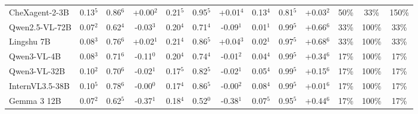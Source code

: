 \documentclass{article}
\begin{document}
\begin{table}[t]
{\begin{tabular}{l@{\hspace{3pt}}ccc@{\hspace{4pt}}ccc@{\hspace{4pt}}ccc@{\hspace{4pt}}ccc}
CheXagent-2-3B & \cellcolor{cfSage3}0.13$^{5}$ & \cellcolor{cfSage3}0.86$^{6}$ & \cellcolor{cfTerra1}+0.00$^{2}$ & \cellcolor{cfSage4}0.21$^{5}$ & \cellcolor{cfSage4}0.95$^{5}$ & \cellcolor{cfTerra1}+0.01$^{4}$ & \cellcolor{cfSage3}0.13$^{4}$ & \cellcolor{cfSage3}0.81$^{5}$ & \cellcolor{cfTerra2}+0.03$^{2}$ & \cellcolor{cfTerra4}50\% & \cellcolor{cfTerra2}33\% & 150\% \\
Qwen2.5-VL-72B & \cellcolor{cfSage2}0.07$^{2}$ & \cellcolor{cfSage2}0.62$^{4}$ & \cellcolor{cfSlate2}-0.03$^{3}$ & \cellcolor{cfSage3}0.20$^{4}$ & \cellcolor{cfSage2}0.71$^{4}$ & \cellcolor{cfSlate2}-0.09$^{1}$ & \cellcolor{cfSage1}0.01$^{1}$ & \cellcolor{cfSage4}0.99$^{5}$ & \cellcolor{cfTerra4}+0.66$^{6}$ & \cellcolor{cfTerra3}33\% & \cellcolor{cfTerra4}100\% & 33\% \\
Lingshu 7B & \cellcolor{cfSage2}0.08$^{3}$ & \cellcolor{cfSage3}0.76$^{6}$ & \cellcolor{cfTerra2}+0.02$^{1}$ & \cellcolor{cfSage4}0.21$^{4}$ & \cellcolor{cfSage3}0.86$^{5}$ & \cellcolor{cfTerra2}+0.04$^{3}$ & \cellcolor{cfSage1}0.02$^{1}$ & \cellcolor{cfSage4}0.97$^{5}$ & \cellcolor{cfTerra4}+0.68$^{6}$ & \cellcolor{cfTerra3}33\% & \cellcolor{cfTerra4}100\% & 33\% \\
Qwen3-VL-4B & \cellcolor{cfSage2}0.08$^{3}$ & \cellcolor{cfSage2}0.71$^{6}$ & \cellcolor{cfSlate3}-0.11$^{0}$ & \cellcolor{cfSage4}0.20$^{4}$ & \cellcolor{cfSage2}0.74$^{4}$ & \cellcolor{cfSlate1}-0.01$^{2}$ & \cellcolor{cfSage1}0.04$^{4}$ & \cellcolor{cfSage4}0.99$^{5}$ & \cellcolor{cfTerra4}+0.34$^{6}$ & \cellcolor{cfTerra3}17\% & \cellcolor{cfTerra4}100\% & 17\% \\
Qwen3-VL-32B & \cellcolor{cfSage2}0.10$^{2}$ & \cellcolor{cfSage2}0.70$^{6}$ & \cellcolor{cfSlate2}-0.02$^{1}$ & \cellcolor{cfSage3}0.17$^{5}$ & \cellcolor{cfSage3}0.82$^{5}$ & \cellcolor{cfSlate2}-0.02$^{1}$ & \cellcolor{cfSage2}0.05$^{4}$ & \cellcolor{cfSage4}0.99$^{5}$ & \cellcolor{cfTerra3}+0.15$^{6}$ & \cellcolor{cfTerra3}17\% & \cellcolor{cfTerra4}100\% & 17\% \\
InternVL3.5-38B & \cellcolor{cfSage2}0.10$^{5}$ & \cellcolor{cfSage3}0.78$^{6}$ & \cellcolor{cfSlate1}-0.00$^{0}$ & \cellcolor{cfSage3}0.17$^{4}$ & \cellcolor{cfSage3}0.86$^{5}$ & \cellcolor{cfSlate1}-0.00$^{2}$ & \cellcolor{cfSage2}0.08$^{4}$ & \cellcolor{cfSage4}0.99$^{5}$ & \cellcolor{cfTerra1}+0.01$^{6}$ & \cellcolor{cfTerra3}17\% & \cellcolor{cfTerra4}100\% & 17\% \\
Gemma 3 12B & \cellcolor{cfSage2}0.07$^{2}$ & \cellcolor{cfSage2}0.62$^{5}$ & \cellcolor{cfSlate4}-0.37$^{1}$ & \cellcolor{cfSage3}0.18$^{4}$ & \cellcolor{cfSage1}0.52$^{0}$ & \cellcolor{cfSlate4}-0.38$^{1}$ & \cellcolor{cfSage2}0.07$^{5}$ & \cellcolor{cfSage4}0.95$^{5}$ & \cellcolor{cfTerra4}+0.44$^{6}$ & \cellcolor{cfTerra3}17\% & \cellcolor{cfTerra4}100\% & 17\% \\

\end{tabular}}
\end{table}
\end{document}
